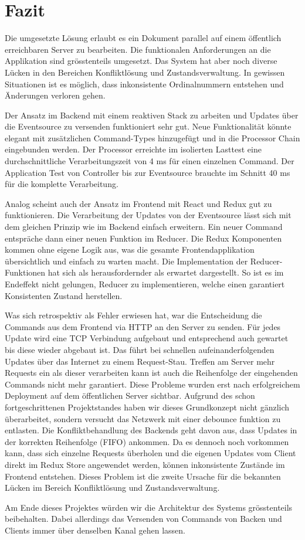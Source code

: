 \section{Fazit}

Die umgesetzte Lösung erlaubt es ein Dokument parallel auf einem öffentlich erreichbaren Server zu bearbeiten.
Die funktionalen Anforderungen an die Applikation sind grösstenteils umgesetzt.
Das System hat aber noch diverse Lücken in den Bereichen Konfliktlösung und Zustandsverwaltung.
In gewissen Situationen ist es möglich, dass inkonsistente Ordinalnummern entstehen und Änderungen verloren gehen.

Der Ansatz im Backend mit einem reaktiven Stack zu arbeiten und Updates über die Eventsource zu versenden funktioniert sehr gut.
Neue Funktionalität könnte elegant mit zusätzlichen Command-Types hinzugefügt und in die Processor Chain eingebunden werden.
Der Processor erreichte im isolierten Lasttest eine durchschnittliche Verarbeitungszeit von 4 ms für einen einzelnen Command.
Der Application Test von Controller bis zur Eventsource brauchte im Schnitt 40 ms für die komplette Verarbeitung.

Analog scheint auch der Ansatz im Frontend mit React und Redux gut zu funktionieren.
Die Verarbeitung der Updates von der Eventsource lässt sich mit dem gleichen Prinzip wie im Backend einfach erweitern.
Ein neuer Command entspräche dann einer neuen Funktion im Reducer.
Die Redux Komponenten kommen ohne eigene Logik aus, was die gesamte Frontendapplikation übersichtlich und einfach zu warten macht.
Die Implementation der Reducer-Funktionen hat sich als herausfordernder als erwartet dargestellt.
So ist es im Endeffekt nicht gelungen, Reducer zu implementieren, welche einen garantiert Konsistenten Zustand herstellen.

Was sich retrospektiv als Fehler erwiesen hat, war die Entscheidung die Commands aus dem Frontend via HTTP an den Server zu senden.
Für jedes Update wird eine TCP Verbindung aufgebaut und entsprechend auch gewartet bis diese wieder abgebaut ist.
Das führt bei schnellen aufeinanderfolgenden Updates über das Internet zu einem Request-Stau.
Treffen am Server mehr Requests ein als dieser verarbeiten kann ist auch die Reihenfolge der eingehenden Commands nicht mehr garantiert.
Diese Probleme wurden erst nach erfolgreichem Deployment auf dem öffentlichen Server sichtbar.
Aufgrund des schon fortgeschrittenen Projektstandes haben wir dieses Grundkonzept nicht gänzlich überarbeitet, sondern versucht das Netzwerk mit einer debounce funktion zu entlasten.
Die Konfliktbehandlung des Backends geht davon aus, dass Updates in der korrekten Reihenfolge (FIFO) ankommen.
Da es dennoch noch vorkommen kann, dass sich einzelne Requests überholen und die eigenen Updates vom Client direkt im Redux Store angewendet werden, können inkonsistente Zustände im Frontend entstehen.
Dieses Problem ist die zweite Ursache für die bekannten Lücken im Bereich Konfliktlösung und Zustandsverwaltung.

Am Ende dieses Projektes würden wir die Architektur des Systems grösstenteils beibehalten.
Dabei allerdings das Versenden von Commands von Backen und Clients immer über denselben Kanal gehen lassen.
